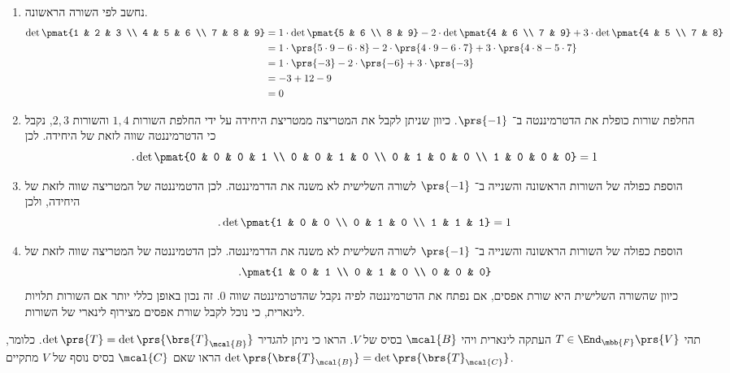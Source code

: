 \documentclass[a4paper,10pt,twoside,openany]{book}
\begin{document}
\begin{solution}
\begin{enumerate}
\item
נחשב לפי השורה הראשונה.
\begin{align*}
\det \pmat{1 & 2 & 3 \\ 4 & 5 & 6 \\ 7 & 8 & 9} &= 1 \cdot \det\pmat{5 & 6 \\ 8 & 9} - 2 \cdot \det \pmat{4 & 6 \\ 7 & 9} + 3 \cdot \det \pmat{4 & 5 \\ 7 & 8}
\\&=
1 \cdot \prs{5 \cdot 9 - 6 \cdot 8} - 2 \cdot \prs{4 \cdot 9 - 6 \cdot 7} + 3 \cdot \prs{4 \cdot 8 - 5 \cdot 7}
\\&=
1 \cdot \prs{-3} -2 \cdot \prs{-6} + 3 \cdot \prs{-3}
\\&=
-3 + 12 - 9
\\&= 0
\end{align*}
\item החלפת שורות כופלת את הדטרמיננטה ב־%
$\prs{-1}$.
כיוון שניתן לקבל את המטריצה ממטריצת היחידה על ידי החלפת השורות
$1,4$
והשורות
$2,3$,
נקבל כי הדטרמיננטה שווה לזאת של היחידה. לכן
\[\text{.} \det \pmat{0 & 0 & 0 & 1 \\ 0 & 0 & 1 & 0 \\ 0 & 1 & 0 & 0 \\ 1 & 0 & 0 & 0} = 1\]
\item
הוספת כפולה של השורות הראשונה והשנייה ב־%
$\prs{-1}$
לשורה השלישית לא משנה את הדרמיננטה. לכן הדטמיננטה של המטריצה שווה לזאת של היחידה, ולכן
\[\text{.} \det \pmat{1 & 0 & 0 \\ 0 & 1 & 0 \\ 1 & 1 & 1} = 1\]
\item
הוספת כפולה של השורות הראשונה והשנייה ב־%
$\prs{-1}$
לשורה השלישית לא משנה את הדרמיננטה. לכן הדטמיננטה של המטריצה שווה לזאת של
\begin{align*}
\text{.} \pmat{1 & 0 & 1 \\ 0 & 1 & 0 \\ 0 & 0 & 0}
\end{align*}
כיוון שהשורה השלישית היא שורת אפסים, אם נפתח את הדטרמיננטה לפיה נקבל שהדטרמיננטה שווה
$0$.
זה נכון באופן כללי יותר אם השורות תלויות לינארית, כי נוכל לקבל שורת אפסים מצירוף לינארי של השורות.
\end{enumerate}
\end{solution}

\begin{exercisechap}
תהי
$T \in \End_{\mbb{F}}\prs{V}$
העתקה לינארית ויהי
$\mcal{B}$
בסיס של
$V$.
הראו כי ניתן להגדיר
$\det\prs{T} = \det\prs{\brs{T}_\mcal{B}}$.
כלומר, הראו שאם
$\mcal{C}$
בסיס נוסף של
$V$
מתקיים
$\det\prs{\brs{T}_\mcal{B}} = \det\prs{\brs{T}_\mcal{C}}$.
\end{exercisechap}
\end{document}

